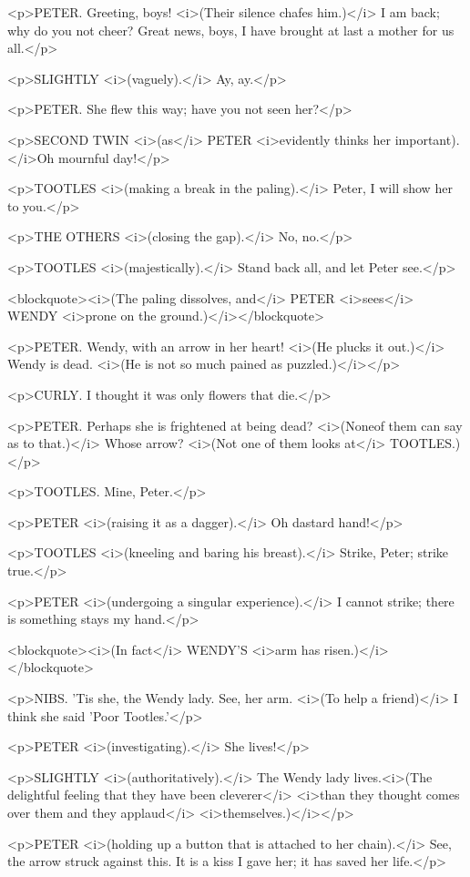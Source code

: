 <p>PETER. Greeting, boys! <i>(Their silence chafes him.)</i> I am back; why do you not cheer? Great news, boys, I have brought at last a mother for us all.</p>

<p>SLIGHTLY <i>(vaguely).</i> Ay, ay.</p>

<p>PETER. She flew this way; have you not seen her?</p>

<p>SECOND TWIN <i>(as</i> PETER <i>evidently thinks her important).</i>Oh mournful day!</p>

<p>TOOTLES <i>(making a break in the paling).</i> Peter, I will show her to you.</p>

<p>THE OTHERS <i>(closing the gap).</i> No, no.</p>

<p>TOOTLES <i>(majestically).</i> Stand back all, and let Peter see.</p>

<blockquote><i>(The paling dissolves, and</i> PETER <i>sees</i> WENDY <i>prone on the ground.)</i></blockquote>

<p>PETER. Wendy, with an arrow in her heart! <i>(He plucks it out.)</i> Wendy is dead. <i>(He is not so much pained as puzzled.)</i></p>

<p>CURLY. I thought it was only flowers that die.</p>

<p>PETER. Perhaps she is frightened at being dead? <i>(Noneof them can say as to that.)</i> Whose arrow? <i>(Not one of them looks at</i> TOOTLES.)</p>

<p>TOOTLES. Mine, Peter.</p>

<p>PETER <i>(raising it as a dagger).</i> Oh dastard hand!</p>

<p>TOOTLES <i>(kneeling and baring his breast).</i> Strike, Peter; strike true.</p>

<p>PETER <i>(undergoing a singular experience).</i> I cannot strike; there is something stays my hand.</p>

<blockquote><i>(In fact</i> WENDY'S <i>arm has risen.)</i></blockquote>

<p>NIBS. 'Tis she, the Wendy lady. See, her arm. <i>(To help a friend)</i> I think she said 'Poor Tootles.'</p>

<p>PETER <i>(investigating).</i> She lives!</p>

<p>SLIGHTLY <i>(authoritatively).</i> The Wendy lady lives.<i>(The delightful feeling that they have been cleverer</i> <i>than they thought comes over them and they applaud</i> <i>themselves.)</i></p>

<p>PETER <i>(holding up a button that is attached to her chain).</i> See, the arrow struck against this. It is a kiss I gave her; it has saved her life.</p>

